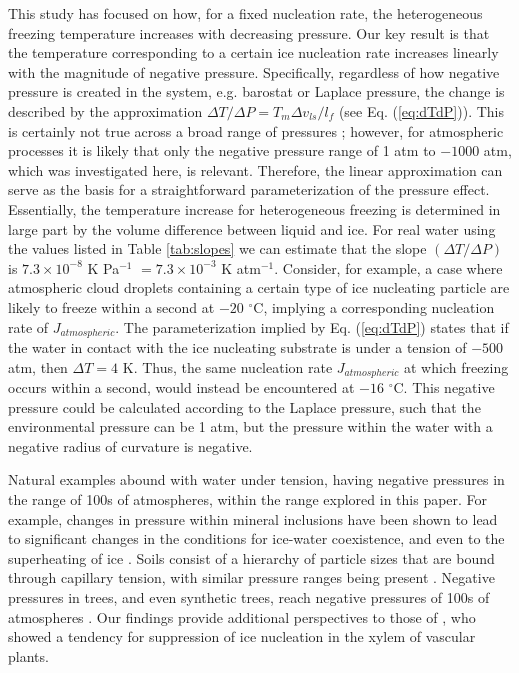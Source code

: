 \documentclass[journal abbreviation, manuscript]{copernicus}
\begin{document}
This study has focused on how, for a fixed nucleation rate, the heterogeneous freezing temperature increases with decreasing pressure. Our key result is that the temperature corresponding to a certain ice nucleation rate increases linearly with the magnitude of negative pressure. Specifically, regardless of how negative pressure is created in the system, e.g. barostat or Laplace pressure, the change is described by the approximation $\Delta T/\Delta P = T_m \Delta v_{ls} / l_f$ (see Eq. (\ref{eq:dTdP})). This is certainly not true across a broad range of pressures \citep[e.g.,][]{bianco2021, espinosa2016}; however, for atmospheric processes it is likely that only the negative pressure range of 1 atm to $-1000$ atm, which was investigated here, is relevant. Therefore, the linear approximation can serve as the basis for a straightforward parameterization of the pressure effect. Essentially, the temperature increase for heterogeneous freezing is determined in large part by the volume difference between liquid and ice. For real water using the values listed in Table \ref{tab:slopes} we can estimate that the slope $(\Delta T/\Delta P)$ is $7.3 \times 10^{-8}$ K Pa$^{-1}$ $= 7.3 \times 10^{-3}$ K atm$^{-1}$. Consider, for example, a case where atmospheric cloud droplets containing a certain type of ice nucleating particle are likely to freeze within a second at $-20$ $^\circ$C, implying a corresponding nucleation rate of $J_{atmospheric}$. The parameterization implied by Eq. (\ref{eq:dTdP}) states that if the water in contact with the ice nucleating substrate is under a tension of $-500$ atm, then $\Delta T = 4$ K. Thus, the same nucleation rate $J_{atmospheric}$ at which freezing occurs within a second, would instead be encountered at $-16$ $^\circ$C. This negative pressure could be calculated according to the Laplace pressure, such that the environmental pressure can be 1 atm, but the pressure within the water with a negative radius of curvature is negative.

Natural examples abound with water under tension, having negative pressures in the range of 100s of atmospheres, within the range explored in this paper. For example, changes in pressure within mineral inclusions have been shown to lead to significant changes in the conditions for ice-water coexistence, and even to the superheating of ice \citep{roedder1967metastable}. Soils consist of a hierarchy of particle sizes that are bound through capillary tension, with similar pressure ranges being present \citep{seiphoori2020}. Negative pressures in trees, and even synthetic trees, reach negative pressures of 100s of atmospheres \citep{wheeler2008transpiration}. Our findings provide additional perspectives to those of \citet{lintunen2013anatomical}, who showed a tendency for suppression of ice nucleation in the xylem of vascular plants. 
\end{document}
